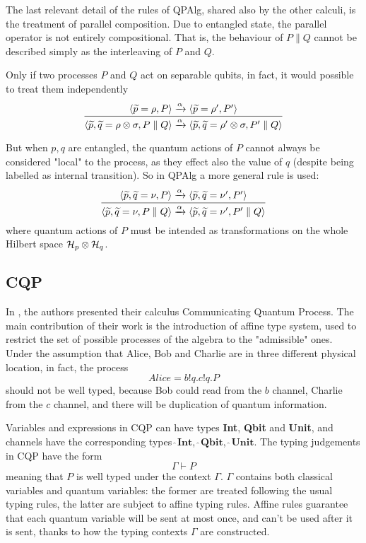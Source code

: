 
The last relevant detail of the rules of QPAlg, shared also by the other calculi, is the treatment of parallel composition. Due to entangled state, the parallel operator is not entirely compositional. That is, the behaviour of $P\parallel Q$ cannot be described simply as the interleaving of $P$ and $Q$.

Only if two processes $P$ and $Q$ act on separable qubits, in fact, it would possible to treat them independently
\[ \infer{\langle \widetilde{p},\widetilde{q}=\rho\otimes\sigma, P\parallel Q\rangle \xrightarrow{\alpha} \langle \widetilde{p},\widetilde{q}=\rho'\otimes\sigma, P'\parallel Q\rangle}{\langle \widetilde{p}=\rho, P\rangle \xrightarrow{\alpha} \langle \widetilde{p}=\rho', P'\rangle}\]


But when $p, q$ are entangled, the quantum actions of $P$ cannot always be considered "local" to the process, as they effect also the value of $q$ (despite being labelled as internal transition). So in QPAlg a more general rule is used:
\[\infer{\langle \widetilde{p},\widetilde{q}=\nu, P\parallel Q\rangle \xrightarrow{\alpha} \langle \widetilde{p},\widetilde{q}=\nu', P'\parallel Q\rangle}{\langle \widetilde{p}, \widetilde{q}=\nu, P\rangle \xrightarrow{\alpha} \langle \widetilde{p}, \widetilde{q}=\nu', P'\rangle}\]
where quantum actions of $P$ must be intended as transformations on the whole Hilbert space $\mathcal{H}_p \otimes \mathcal{H}_q$.



\subsection{CQP}
In \cite{gayCommunicatingQuantumProcesses2005}, the authors presented their calculus Communicating Quantum Process. The main contribution of their work is the introduction of affine type system, used to restrict the set of possible processes of the algebra to the "admissible" ones. Under the assumption that Alice, Bob and Charlie are in three different physical location, in fact, the process \[Alice = b!q.c!q.P\] should not be well typed, because Bob could read from the $b$ channel, Charlie from the $c$ channel, and there will be duplication of quantum information. 


Variables and expressions in CQP can have types \textbf{Int}, \textbf{Qbit} and \textbf{Unit}, and channels have the corresponding types $\widehat{\ }\textbf{Int}$, $\widehat{\ }\textbf{Qbit}$, $\widehat{\ }\textbf{Unit}$.
The typing judgements in CQP have the form \[\Gamma \vdash P\] meaning that $P$ is well typed under the context $\Gamma$. $\Gamma$ contains both classical variables and quantum variables: the former are treated following the usual typing rules, the latter are subject to affine typing rules. Affine rules guarantee that each quantum variable will be sent at most once, and can't be used after it is sent, thanks to how the typing contexts $\Gamma$ are constructed.



